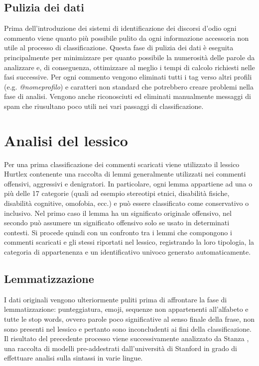 \subsection{Pulizia dei dati}
    Prima dell'introduzione dei sistemi di identificazione dei discorsi d'odio ogni commento viene quanto più possibile pulito da ogni informazione accessoria non utile al processo di classificazione. Questa fase di pulizia dei dati è eseguita principalmente per minimizzare per quanto possibile la numerosità delle parole da analizzare e, di conseguenza, ottimizzare al meglio i tempi di calcolo richiesti nelle fasi successive.
    Per ogni commento vengono eliminati tutti i tag verso altri profili (e.g. \textit{@nomeprofilo}) e caratteri non standard che potrebbero creare problemi nella fase di analisi.
    Vengono anche riconosciuti ed eliminati manualmente messaggi di spam che riusultano poco utili nei vari passaggi di classificazione.





\section{Analisi del lessico}
Per una prima classificazione dei commenti scaricati viene utilizzato il lessico Hurtlex \cite{Hurtlex} contenente una raccolta di lemmi generalmente utilizzati nei commenti offensivi, aggressivi e denigratori. In particolare, ogni lemma appartiene ad una o più delle 17 categorie (quali ad esempio stereotipi etnici, disabilità fisiche, disabilità cognitive, omofobia, ecc.) e può essere classificato come conservativo o inclusivo. Nel primo caso il lemma ha un significato originale offensivo, nel secondo può assumere un significato offensivo solo se usato in determinati contesti. Si procede quindi con un confronto tra i lemmi che compongono i commenti scaricati e gli stessi riportati nel lessico, registrando la loro tipologia, la categoria di appartenenza e un identificativo univoco generato automaticamente.
    
\subsection{Lemmatizzazione}
    I dati originali vengono ulteriormente puliti prima di affrontare la fase di lemmatizzazione: punteggiatura, emoji, sequenze non appartenenti all'alfabeto e tutte le stop words, ovvero parole poco significative al senso finale della frase, non sono presenti nel lessico e pertanto sono inconcludenti ai fini della classificazione.
    Il risultato del precedente processo viene successivamente analizzato da Stanza \cite{Stanza}, una raccolta di modelli pre-addestrati dall'università di Stanford in grado di effettuare analisi sulla sintassi in varie lingue. 
    
